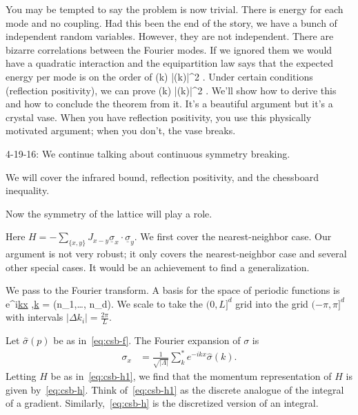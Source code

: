 \documentclass[12pt]{book}
\theoremstyle{norm}
\begin{document}
You may be tempted to say the problem is now trivial. There is energy for each mode and no coupling. Had this been the end of the story, we have a bunch of independent random variables. However, they are not independent. There are bizarre correlations between the Fourier modes. If we ignored them we would have a quadratic interaction and the equipartition law says that the expected energy per mode is on the order of 
\be
{}(k) |\widehat{\sigma}(k)|^2 \approx {}.
\ee
Under certain conditions (reflection positivity), we can prove
\be
{}(k) |\widehat{\sigma}(k)|^2 \le {}.
\ee
We'll show how to derive this and how to conclude the theorem from it. It's a beautiful argument but it's a crystal vase. When you have reflection positivity, you use this physically motivated argument; when you don't, the vase breaks.















{\color{blue}4-19-16: We continue talking about continuous symmetry breaking.}

We will cover the infrared bound, reflection positivity, and the chessboard inequality.

Now the symmetry of the lattice will play a role.

Here $H=-\sum_{\{x,y\}} J_{x-y} \underline{\sigma}_x\cdot \underline{\sigma}_y$. We first cover the nearest-neighbor case. Our argument is not very robust; it only covers the nearest-neighbor case and several other special cases. It would be an achievement to find a generalization.

We pass to the Fourier transform. A basis for the space of periodic functions is 
\be
{}e^{i\underline{k}\cdot \underline{x}} ,\qquad \underline{k} =  (n_1,\ldots, n_d).
\ee
We scale to take the $(0,L]^d$ grid into the grid $(-\pi,\pi]^d$ with intervals $|\Delta k_i| = \frac{2\pi}{L}$. 

Let $\widehat{\sigma}(p)$ be as in~\eqref{eq:csb-f}. The Fourier expansion of $\sigma$ is
\begin{align}
\sigma_x &= \frac{1}{\sqrt{|\Lambda|}} \sum_k^* e^{-ikx}\widehat{\sigma}(k).
\end{align}
Letting $H$ be as in~\eqref{eq:csb-h1}, we find that the momentum representation of $H$ is given by~\eqref{eq:csb-h}.
Think of~\eqref{eq:csb-h1} as the discrete analogue of the integral of a gradient. Similarly,~\eqref{eq:csb-h} is the discretized version of an integral.
\end{document}
